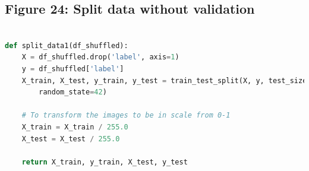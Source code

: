 \documentclass{article}
\begin{document}
\subsection{Figure 24: Split data without validation}
\begin{lstlisting}[language=Python]
    
def split_data1(df_shuffled):
    X = df_shuffled.drop('label', axis=1)
    y = df_shuffled['label']
    X_train, X_test, y_train, y_test = train_test_split(X, y, test_size=0.15, \
        random_state=42)

    # To transform the images to be in scale from 0-1
    X_train = X_train / 255.0
    X_test = X_test / 255.0

    return X_train, y_train, X_test, y_test

\end{lstlisting}
\end{document}
